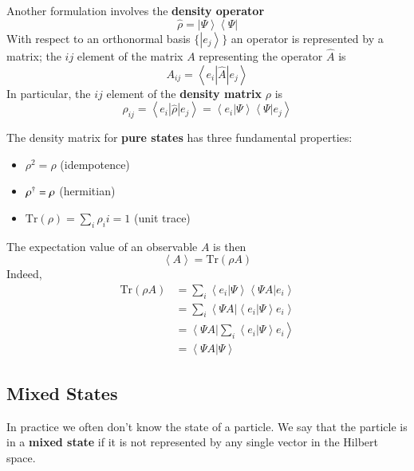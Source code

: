 \documentclass[12pt, a4paper, oneside, openright, titlepage]{book}
\newcommand{\bra}[1]{\left\langle#1\right\vert}
\newcommand{\ket}[1]{\left\vert#1\right\rangle}
\newcommand{\braket}[2]{\left\langle#1\right\vert\left.#2\right\rangle}
\newcommand{\brkt}[1]{\left\langle #1\right\rangle}
\begin{document}
Another formulation involves the \textbf{density operator} $$\hat{\rho} = \ket{\Psi}\bra{\Psi}$$
With respect to an orthonormal basis $\{\ket{e_j}\}$ an operator is represented by a matrix; the $ij$ element of the matrix $A$ representing the operator $\hat{A}$ is $$A_{ij} = \brkt{e_i|\hat{A}|e_j}$$
In particular, the $ij$ element of the \textbf{density matrix} $\rho$ is $$\rho_{ij} = \brkt{e_i|\hat{\rho}|e_j} = \braket{e_i}{\Psi}\braket{\Psi}{e_j}$$
\begin{rmk}
    The density matrix for \textbf{pure states} has three fundamental properties: \begin{itemize}
        \item $\rho^2 = \rho$ (idempotence) 
        \item $\rho^{\text{\textdagger}} = \rho$ (hermitian) 
        \item $\text{Tr}(\rho) = \sum_i\rho_ii = 1$ (unit trace)
    \end{itemize}
\end{rmk}

The expectation value of an observable $A$ is then $$\brkt{A} = \text{Tr}(\rho A)$$
Indeed, \begin{align*}
    \text{Tr}(\rho A) &= \sum_i\braket{e_i}{\Psi}\braket{\Psi A}{e_i} \\
    &= \sum_i\braket{\Psi A}{\braket{e_i}{\Psi}e_i} \\
    &= \braket{\Psi A}{\sum_i\braket{e_i}{\Psi}e_i} \\
    &= \braket{\Psi A}{\Psi}
\end{align*}

\subsection{Mixed States}

In practice we often don't know the state of a particle. We say that the particle is in a \textbf{mixed state} if it is not represented by any single vector in the Hilbert space.
\end{document}
